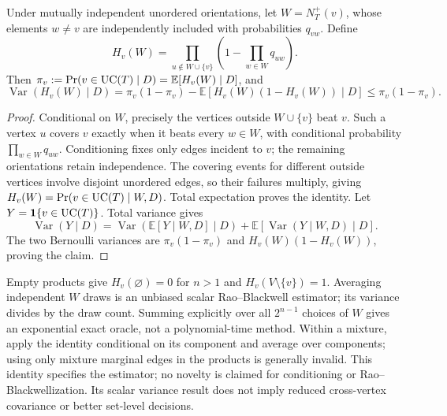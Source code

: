 \begin{proposition}\label{prop:posterior-uc-integration}
Under mutually independent unordered orientations, let $W=N_T^+(v)$, whose elements $w\ne v$ are independently included with probabilities $q_{vw}$. Define
\[
H_v(W)=\prod_{u\notin W\cup\{v\}}\left(1-\prod_{w\in W}q_{uw}\right).
\]
Then $\pi_v:=\Pr(v\in\mathrm{UC}(T)\mid D)=\mathbb E[H_v(W)\mid D]$, and
\[
\operatorname{Var}(H_v(W)\mid D)
=\pi_v(1-\pi_v)-\mathbb E[H_v(W)(1-H_v(W))\mid D]
\le\pi_v(1-\pi_v).
\]
\end{proposition}
\begin{proof}
Conditional on $W$, precisely the vertices outside $W\cup\{v\}$ beat $v$. Such a vertex $u$ covers $v$ exactly when it beats every $w\in W$, with conditional probability $\prod_{w\in W}q_{uw}$. Conditioning fixes only edges incident to $v$; the remaining orientations retain independence. The covering events for different outside vertices involve disjoint unordered edges, so their failures multiply, giving $H_v(W)=\Pr(v\in\mathrm{UC}(T)\mid W,D)$. Total expectation proves the identity. Let $Y=\mathbf1\{v\in\mathrm{UC}(T)\}$. Total variance gives
\[
\operatorname{Var}(Y\mid D)=\operatorname{Var}(\mathbb E[Y\mid W,D]\mid D)+\mathbb E[\operatorname{Var}(Y\mid W,D)\mid D].
\]
The two Bernoulli variances are $\pi_v(1-\pi_v)$ and $H_v(W)(1-H_v(W))$, proving the claim.
\end{proof}
Empty products give $H_v(\varnothing)=0$ for $n>1$ and $H_v(V\setminus\{v\})=1$. Averaging independent $W$ draws is an unbiased scalar Rao--Blackwell estimator; its variance divides by the draw count. Summing explicitly over all $2^{n-1}$ choices of $W$ gives an exponential exact oracle, not a polynomial-time method. Within a mixture, apply the identity conditional on its component and average over components; using only mixture marginal edges in the products is generally invalid. This identity specifies the estimator; no novelty is claimed for conditioning or Rao--Blackwellization. Its scalar variance result does not imply reduced cross-vertex covariance or better set-level decisions.

